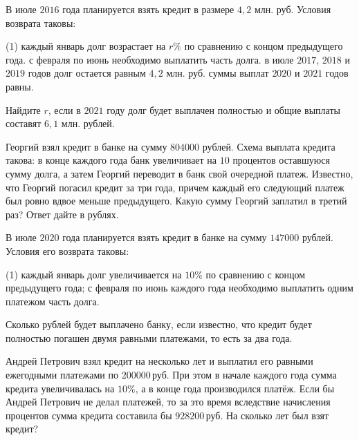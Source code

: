 \begin{consultation}
	\begin{listofex}
		\item В июле \( 2016 \) года планируется взять кредит в размере \( 4,2 \) млн. руб. Условия возврата таковы: 
		\begin{tasks}(1)
			\task каждый январь долг возрастает на \( r\% \) по сравнению с концом предыдущего года.
			\task с февраля по июнь необходимо выплатить часть долга.
			\task в июле \( 2017 \), \( 2018 \) и \( 2019 \) годов долг остается равным \( 4,2 \) млн. руб. 
			\task суммы выплат \( 2020 \) и \( 2021 \) годов равны.
		\end{tasks}		
		Найдите \( r \), если в \( 2021 \) году долг будет выплачен полностью и общие выплаты составят \( 6,1 \)  млн. рублей.
		\item Георгий взял кредит в банке на сумму \( 804 000 \) рублей. Схема выплата кредита такова: в конце каждого года банк увеличивает на \( 10 \) процентов оставшуюся сумму долга, а затем Георгий переводит в банк свой очередной платеж. Известно, что Георгий погасил кредит за три года, причем каждый его следующий платеж был ровно вдвое меньше предыдущего. Какую сумму Георгий заплатил в третий раз? Ответ дайте в рублях.
		\item В июле \( 2020 \) года планируется взять кредит в банке на сумму \( 147 000 \) рублей. Условия его возврата таковы:
		\begin{tasks}(1)
			\task каждый январь долг увеличивается на \( 10\% \) по сравнению с концом предыдущего года;
			\task с февраля по июнь каждого года необходимо выплатить одним платежом часть долга.
		\end{tasks}	
		Сколько рублей будет выплачено банку, если известно, что кредит будет полностью погашен двумя равными платежами, то есть за два года.
		\item Андрей Петрович взял кредит на несколько лет и выплатил его равными ежегодными платежами по \( 200 000 \) руб. При этом в начале каждого года сумма кредита увеличивалась на \( 10\% \), а в конце года производился платёж. Если бы Андрей Петрович не делал платежей, то за это время вследствие начисления процентов сумма кредита составила бы \( 928 200 \) руб. На сколько лет был взят кредит?
	\end{listofex}
\end{consultation}
